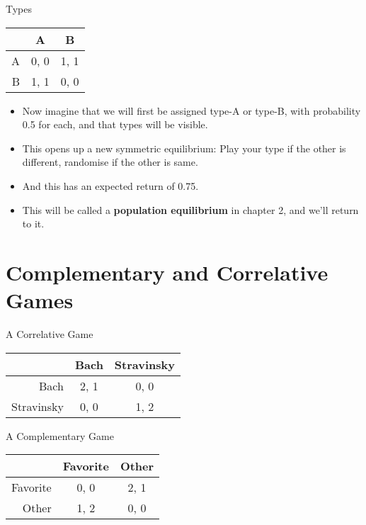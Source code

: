 \documentclass[
  ignorenonframetext,
]{beamer}
\providecommand{\tightlist}{%
  \setlength{\itemsep}{0pt}\setlength{\parskip}{0pt}}
\begin{document}
\begin{frame}{Types}
\protect\hypertarget{types-1}{}
\begin{longtable}[]{@{}rcc@{}}
\toprule
& A & B \\
\midrule
\endhead
A & 0, 0 & 1, 1 \\
B & 1, 1 & 0, 0 \\
\bottomrule
\end{longtable}

\begin{itemize}
\tightlist
\item
  Now imagine that we will first be assigned type-A or type-B, with
  probability 0.5 for each, and that types will be visible.
\item
  This opens up a new symmetric equilibrium: Play your type if the other
  is different, randomise if the other is same.
\item
  And this has an expected return of 0.75. \pause
\item
  This will be called a \textbf{population equilibrium} in chapter 2,
  and we'll return to it.
\end{itemize}
\end{frame}

\hypertarget{complementary-and-correlative-games}{%
\section{Complementary and Correlative
Games}\label{complementary-and-correlative-games}}

\begin{frame}{A Correlative Game}
\protect\hypertarget{a-correlative-game}{}
\begin{longtable}[]{@{}rcc@{}}
\toprule
& Bach & Stravinsky \\
\midrule
\endhead
Bach & 2, 1 & 0, 0 \\
Stravinsky & 0, 0 & 1, 2 \\
\bottomrule
\end{longtable}
\end{frame}

\begin{frame}{A Complementary Game}
\protect\hypertarget{a-complementary-game}{}
\begin{longtable}[]{@{}rcc@{}}
\toprule
& Favorite & Other \\
\midrule
\endhead
Favorite & 0, 0 & 2, 1 \\
Other & 1, 2 & 0, 0 \\
\bottomrule
\end{longtable}
\end{frame}
\end{document}
